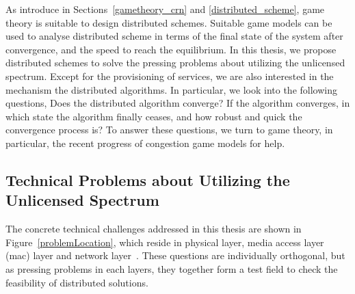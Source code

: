As introduce in Sections~\ref{gametheory_crn} and \ref{distributed_scheme}, game theory is suitable to design distributed schemes.
Suitable game models can be used to analyse distributed scheme in terms of the final state of the system after convergence, and the speed to reach the equilibrium.
In this thesis, we propose distributed schemes to solve the pressing problems about utilizing the unlicensed spectrum.
Except for the provisioning of services, we are also interested in the mechanism the distributed algorithms.
In particular, we look into the following questions, 
Does the distributed algorithm converge? 
If the algorithm converges, in which state the algorithm finally ceases, and how robust and quick the convergence process is?
To answer these questions, we turn to game theory, in particular, the recent progress of congestion game models for help.




\subsection{Technical Problems about Utilizing the Unlicensed Spectrum}

The concrete technical challenges addressed in this thesis are shown in Figure~\ref{problemLocation}, which reside in physical layer, media access layer (\gls{mac}) layer and network layer~\cite{osi}. 
These questions are individually orthogonal, but as pressing problems in each layers, they together form a test field to check the feasibility of distributed solutions.

